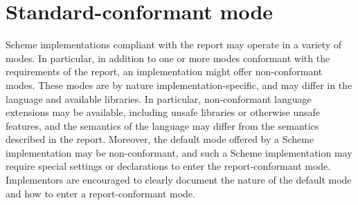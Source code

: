 \chapter{Standard-conformant mode}
\label{standardconformantmode}

Scheme implementations compliant with the report may operate in a
variety of modes.  In particular, in addition to one or more modes
conformant with the requirements of the report, an implementation might
offer non-conformant modes.  These modes are by nature
implementation-specific, and may differ in the language and available
libraries.  In particular, non-conformant language extensions may be
available, including unsafe libraries or otherwise unsafe features, and the
semantics of the language may differ from the semantics described in
the report.  Moreover, the default mode offered by a Scheme
implementation may be non-conformant, and such a Scheme implementation
may require special settings or declarations to enter the
report-conformant mode.  Implementors are encouraged to clearly
document the nature of the default mode and how to enter
a report-conformant mode.

